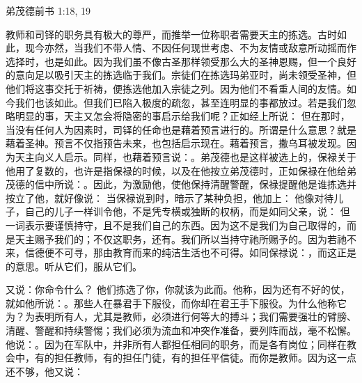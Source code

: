 弟茂德前书 1:18, 19\par

\par

教师和司铎的职务具有极大的尊严，而推举一位称职者需要天主的拣选。古时如此，现今亦然，当我们不带人情、不因任何现世考虑、不为友情或敌意所动摇而作选择时，也是如此。因为我们虽不像古圣那样领受那么大的圣神恩赐，但一个良好的意向足以吸引天主的拣选临于我们。宗徒们在拣选玛弟亚时，尚未领受圣神，但他们将这事交托于祈祷，便拣选他加入宗徒之列。因为他们不看重人间的友情。如今我们也该如此。但我们已陷入极度的疏忽，甚至连明显的事都放过。若是我们忽略明显的事，天主又怎会将隐密的事启示给我们呢？正如经上所说： 但在那时，当没有任何人为因素时，司铎的任命也是藉着预言进行的。所谓是什么意思？就是藉着圣神。预言不仅指预告未来，也包括启示现在。藉着预言，撒乌耳被发现。因为天主向义人启示。同样，也藉着预言说：。弟茂德也是这样被选上的，保禄关于他用了复数的，也许是指保禄的时候，以及在他按立弟茂德时，正如保禄在他给弟茂德的信中所说：。因此，为激励他，使他保持清醒警醒，保禄提醒他是谁拣选并按立了他，就好像说： 当保禄说到时，暗示了某种负担，他加上： 他像对待儿子，自己的儿子一样训令他，不是凭专横或独断的权柄，而是如同父亲，说： 但一词表示要谨慎持守，且不是我们自己的东西。因为这不是我们为自己取得的，而是天主赐予我们的；不仅这职务，还有。我们所以当持守祂所赐予的。因为若祂不来，信德便不可寻，那由教育而来的纯洁生活也不可得。如同保禄说：，而这正是的意思。听从它们，服从它们。\par

又说：你命令什么？ 他们拣选了你，你就该为此而。他称，因为还有不好的仗，就如他所说：。那些人在暴君手下服役，而你却在君王手下服役。为什么他称它为？为表明所有人，尤其是教师，必须进行何等大的搏斗；我们需要强壮的臂膀、清醒、警醒和持续警惕；我们必须为流血和冲突作准备，要列阵而战，毫不松懈。他说：。因为在军队中，并非所有人都担任相同的职务，而是各有岗位；同样在教会中，有的担任教师，有的担任门徒，有的担任平信徒。而你是教师。因为这一点还不够，他又说：\par

